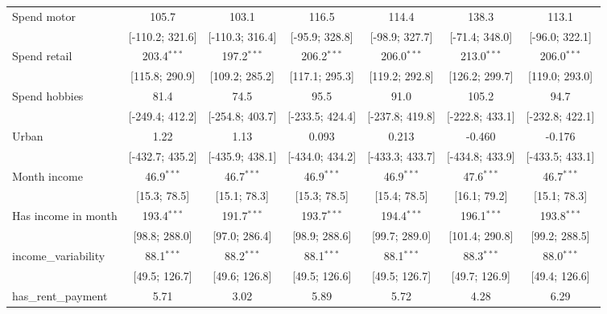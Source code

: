 \begin{table}[htbp]
\begin{threeparttable}[b]
\begin{tabular}{lcccccc}
         Spend motor               & 105.7           & 103.1           & 116.5           & 114.4           & 138.3           & 113.1\\   
                                   & [-110.2; 321.6] & [-110.3; 316.4] & [-95.9; 328.8]  & [-98.9; 327.7]  & [-71.4; 348.0]  & [-96.0; 322.1]\\   
         Spend retail              & 203.4$^{***}$   & 197.2$^{***}$   & 206.2$^{***}$   & 206.0$^{***}$   & 213.0$^{***}$   & 206.0$^{***}$\\   
                                   & [115.8; 290.9]  & [109.2; 285.2]  & [117.1; 295.3]  & [119.2; 292.8]  & [126.2; 299.7]  & [119.0; 293.0]\\   
         Spend hobbies             & 81.4            & 74.5            & 95.5            & 91.0            & 105.2           & 94.7\\   
                                   & [-249.4; 412.2] & [-254.8; 403.7] & [-233.5; 424.4] & [-237.8; 419.8] & [-222.8; 433.1] & [-232.8; 422.1]\\   
         Urban                     & 1.22            & 1.13            & 0.093           & 0.213           & -0.460          & -0.176\\   
                                   & [-432.7; 435.2] & [-435.9; 438.1] & [-434.0; 434.2] & [-433.3; 433.7] & [-434.8; 433.9] & [-433.5; 433.1]\\   
         Month income              & 46.9$^{***}$    & 46.7$^{***}$    & 46.9$^{***}$    & 46.9$^{***}$    & 47.6$^{***}$    & 46.7$^{***}$\\   
                                   & [15.3; 78.5]    & [15.1; 78.3]    & [15.3; 78.5]    & [15.4; 78.5]    & [16.1; 79.2]    & [15.1; 78.3]\\   
         Has income in month       & 193.4$^{***}$   & 191.7$^{***}$   & 193.7$^{***}$   & 194.4$^{***}$   & 196.1$^{***}$   & 193.8$^{***}$\\   
                                   & [98.8; 288.0]   & [97.0; 286.4]   & [98.9; 288.6]   & [99.7; 289.0]   & [101.4; 290.8]  & [99.2; 288.5]\\   
         income\_variability       & 88.1$^{***}$    & 88.2$^{***}$    & 88.1$^{***}$    & 88.1$^{***}$    & 88.3$^{***}$    & 88.0$^{***}$\\   
                                   & [49.5; 126.7]   & [49.6; 126.8]   & [49.5; 126.6]   & [49.5; 126.7]   & [49.7; 126.9]   & [49.4; 126.6]\\   
         has\_rent\_payment        & 5.71            & 3.02            & 5.89            & 5.72            & 4.28            & 6.29\\   

\end{tabular}
\end{threeparttable}
\end{table}
